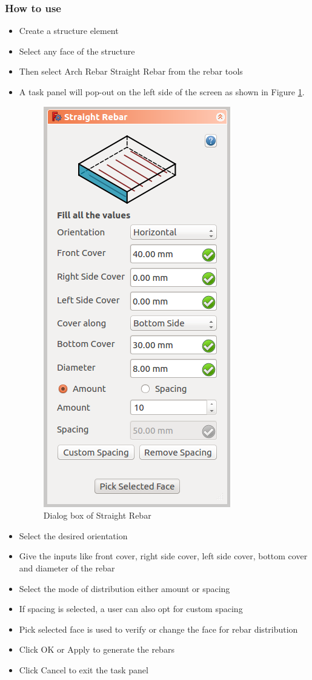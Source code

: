 \subsubsection{How to use}
\begin{itemize}
\item Create a structure element
\item Select any face of the structure
\item Then select Arch Rebar Straight Rebar from the rebar tools
\item A task panel will pop-out on the left side of the screen as shown in Figure \ref{straightrebardialog}.
\begin{figure}
    \centering \includegraphics[scale=0.60]{images/StraightRebarDialog.png}
    \caption{Dialog box of Straight Rebar}
    \label{straightrebardialog}
\end{figure}
\item Select the desired orientation
\item Give the inputs like front cover, right side cover, left side cover, bottom cover and diameter of the rebar
\item Select the mode of distribution either amount or spacing
\item If spacing is selected, a user can also opt for custom spacing
\item Pick selected face is used to verify or change the face for rebar distribution
\item Click OK or Apply to generate the rebars
\item Click Cancel to exit the task panel
\end{itemize}



